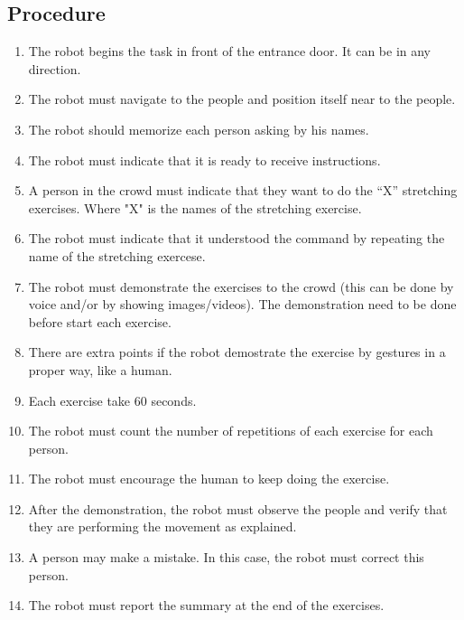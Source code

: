 \subsection*{Procedure}
\begin{enumerate}[nosep]
	\item The robot begins the task in front of the entrance door. It can be in any direction.
	\item The robot must navigate to the people and position itself near to the people.
	\item The robot should memorize each person asking by his names.
 	\item The robot must indicate that it is ready to receive instructions.
	\item A person in the crowd must indicate that they want to do the “X” stretching exercises. Where "X" is the names of the stretching exercise.
	\item The robot must indicate that it understood the command by repeating the name of the stretching exercese.
	\item The robot must demonstrate the exercises to the crowd (this can be done by voice and/or by showing images/videos). The demonstration need to be done before start each exercise.
	\item There are extra points if the robot demostrate the exercise by gestures in a proper way, like a human. 
	\item Each exercise take 60 seconds.
	\item The robot must count the number of repetitions of each exercise for each person.
	\item The robot must encourage the human to keep doing the exercise.
	\item After the demonstration, the robot must observe the people and verify that they are performing the movement as explained.
	\item A person may make a mistake. In this case, the robot must correct this person. 
	\item The robot must report the summary at the end of the exercises.
\end{enumerate}

